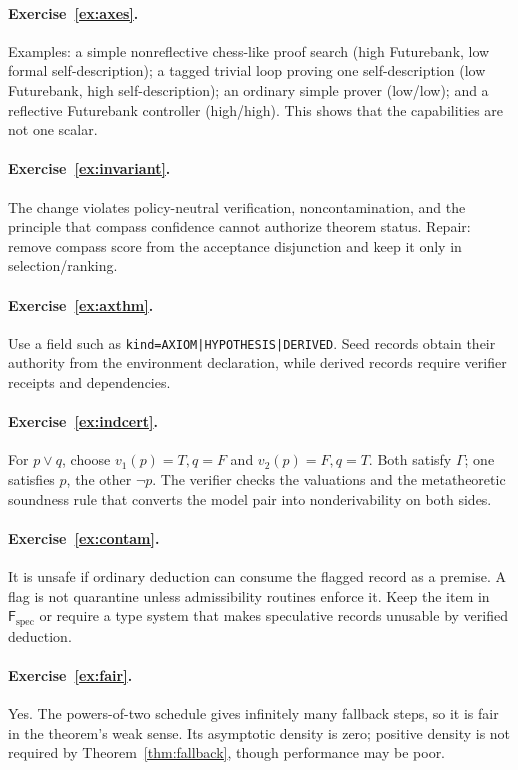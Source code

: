 \documentclass[11pt,openany]{book}
\theoremstyle{definition}
\theoremstyle{remark}
\newcommand{\Future}{\mathsf{F}}
\newcommand{\Spec}{\Future_{\mathrm{spec}}}
\begin{document}
\paragraph{Exercise~\ref{ex:axes}.}
Examples: a simple nonreflective chess-like proof search (high Futurebank, low formal self-description); a tagged trivial loop proving one self-description (low Futurebank, high self-description); an ordinary simple prover (low/low); and a reflective Futurebank controller (high/high). This shows that the capabilities are not one scalar.

\paragraph{Exercise~\ref{ex:invariant}.}
The change violates policy-neutral verification, noncontamination, and the principle that compass confidence cannot authorize theorem status. Repair: remove compass score from the acceptance disjunction and keep it only in selection/ranking.

\paragraph{Exercise~\ref{ex:axthm}.}
Use a field such as \texttt{kind=AXIOM|HYPOTHESIS|DERIVED}. Seed records obtain their authority from the environment declaration, while derived records require verifier receipts and dependencies.

\paragraph{Exercise~\ref{ex:indcert}.}
For $p\lor q$, choose $v_1(p)=T,q=F$ and $v_2(p)=F,q=T$. Both satisfy $\Gamma$; one satisfies $p$, the other $\neg p$. The verifier checks the valuations and the metatheoretic soundness rule that converts the model pair into nonderivability on both sides.

\paragraph{Exercise~\ref{ex:contam}.}
It is unsafe if ordinary deduction can consume the flagged record as a premise. A flag is not quarantine unless admissibility routines enforce it. Keep the item in $\Spec$ or require a type system that makes speculative records unusable by verified deduction.

\paragraph{Exercise~\ref{ex:fair}.}
Yes. The powers-of-two schedule gives infinitely many fallback steps, so it is fair in the theorem's weak sense. Its asymptotic density is zero; positive density is not required by Theorem~\ref{thm:fallback}, though performance may be poor.
\end{document}
